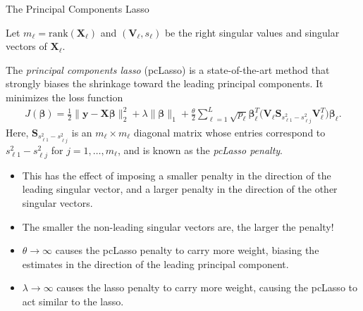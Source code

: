 \documentclass[8pt]{beamer}
\newcommand{\mydef}[1]{\textcolor{SteelBlue3}{\textit{#1}}} %
\begin{document}
\begin{frame}{The Principal Components Lasso}

Let $m_{\ell} = \mathrm{rank}(\mathbf{X}_{\ell})$ and $(\mathbf{V}_{\ell}, s_{\ell})$ be the right singular values and singular vectors of $\mathbf{X}_{\ell}$. %

The \mydef{principal components lasso} (pcLasso) \cite{2018arXiv181004651T} is a state-of-the-art method that strongly biases the shrinkage toward the leading principal components. It minimizes the loss function
\begin{align*}
    J(\bm{\beta}) = \frac{1}{2} \| \mathbf{y}  - \mathbf{X} \bm{\beta} \|_2^2 + \lambda \| \bm{\beta} \|_1 + \frac{\theta}{2} \sum_{\ell=1}^L \sqrt{p_{\ell}} \bm{\beta}_{\ell}^T \Big(\mathbf{V}_{\ell} \mathbf{S}_{s_{\ell 1}^2 - s_{\ell j}^2} \mathbf{V}_{\ell}^T \Big) \bm{\beta}_{\ell}.
\end{align*} %
Here, $\displaystyle \mathbf{S}_{s_{\ell 1}^2 - s_{\ell j}^2}$ is an $m_{\ell} \times m_{\ell}$ diagonal matrix whose entries correspond to $s_{\ell 1}^2 - s_{\ell j}^2$ for $j=1,\ldots,m_{\ell}$, and is known as the \mydef{pcLasso penalty}. %
\begin{itemize}
    \item This has the effect of imposing a smaller penalty in the direction of the leading singular vector, and a larger penalty in the direction of the other singular vectors. %
    \item The smaller the non-leading singular vectors are, the larger the penalty! %
    \item $\theta \to \infty$ causes the pcLasso penalty to carry more weight, biasing the estimates in the direction of the leading principal component. %
    \item $\lambda \to \infty$ causes the lasso penalty to carry more weight, causing the pcLasso to act similar to the lasso.
\end{itemize}
    
\end{frame}
\end{document}
